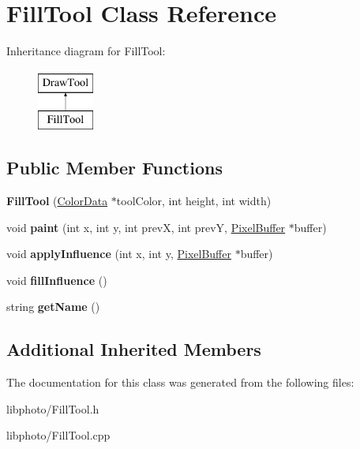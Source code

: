 \hypertarget{classFillTool}{\section{Fill\-Tool Class Reference}
\label{classFillTool}
}
Inheritance diagram for Fill\-Tool\-:\begin{figure}[H]
\begin{center}
\leavevmode
\includegraphics[height=2.000000cm]{classFillTool}
\end{center}
\end{figure}
\subsection*{Public Member Functions}
\begin{DoxyCompactItemize}
\item 
\hypertarget{classFillTool_a6abe3f5032f5e69a11cf38b94da90a62}{{\bfseries Fill\-Tool} (\hyperlink{classColorData}{Color\-Data} $\ast$tool\-Color, int height, int width)}\label{classFillTool_a6abe3f5032f5e69a11cf38b94da90a62}

\item 
\hypertarget{classFillTool_a81a3a46e5600d6250634766e8b769796}{void {\bfseries paint} (int x, int y, int prev\-X, int prev\-Y, \hyperlink{classPixelBuffer}{Pixel\-Buffer} $\ast$buffer)}\label{classFillTool_a81a3a46e5600d6250634766e8b769796}

\item 
\hypertarget{classFillTool_a8ad4d0d5b2a5379be3720c89a102ddb3}{void {\bfseries apply\-Influence} (int x, int y, \hyperlink{classPixelBuffer}{Pixel\-Buffer} $\ast$buffer)}\label{classFillTool_a8ad4d0d5b2a5379be3720c89a102ddb3}

\item 
\hypertarget{classFillTool_a888fd877cf0937e9b36be2d56f06de3e}{void {\bfseries fill\-Influence} ()}\label{classFillTool_a888fd877cf0937e9b36be2d56f06de3e}

\item 
\hypertarget{classFillTool_a7466c932b389d32e4a200763ccb087be}{string {\bfseries get\-Name} ()}\label{classFillTool_a7466c932b389d32e4a200763ccb087be}

\end{DoxyCompactItemize}
\subsection*{Additional Inherited Members}


The documentation for this class was generated from the following files\-:\begin{DoxyCompactItemize}
\item 
libphoto/Fill\-Tool.\-h\item 
libphoto/Fill\-Tool.\-cpp\end{DoxyCompactItemize}
